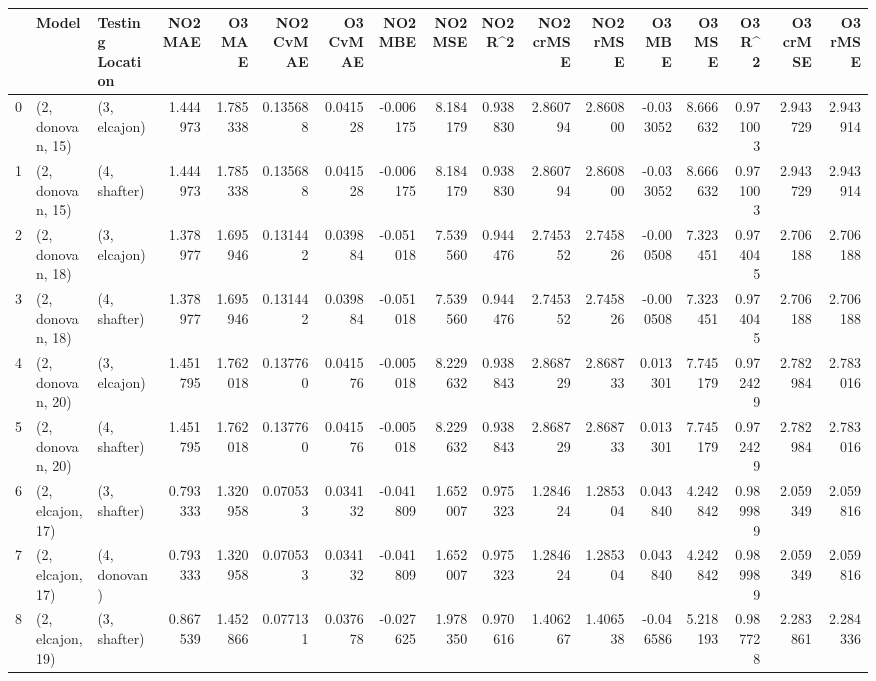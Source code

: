 \begin{tabular}{lllrrrrrrrrrrrrrr}
\toprule
{} &             Model & Testing Location &   NO2 MAE &    O3 MAE &  NO2 CvMAE &  O3 CvMAE &   NO2 MBE &    NO2 MSE &   NO2 R\textasciicircum2 &  NO2 crMSE &  NO2 rMSE &    O3 MBE &     O3 MSE &    O3 R\textasciicircum2 &  O3 crMSE &   O3 rMSE \\
\midrule
0  &  (2, donovan, 15) &     (3, elcajon) &  1.444973 &  1.785338 &   0.135688 &  0.041528 & -0.006175 &   8.184179 &  0.938830 &   2.860794 &  2.860800 & -0.033052 &   8.666632 &  0.971003 &  2.943729 &  2.943914 \\
1  &  (2, donovan, 15) &     (4, shafter) &  1.444973 &  1.785338 &   0.135688 &  0.041528 & -0.006175 &   8.184179 &  0.938830 &   2.860794 &  2.860800 & -0.033052 &   8.666632 &  0.971003 &  2.943729 &  2.943914 \\
2  &  (2, donovan, 18) &     (3, elcajon) &  1.378977 &  1.695946 &   0.131442 &  0.039884 & -0.051018 &   7.539560 &  0.944476 &   2.745352 &  2.745826 & -0.000508 &   7.323451 &  0.974045 &  2.706188 &  2.706188 \\
3  &  (2, donovan, 18) &     (4, shafter) &  1.378977 &  1.695946 &   0.131442 &  0.039884 & -0.051018 &   7.539560 &  0.944476 &   2.745352 &  2.745826 & -0.000508 &   7.323451 &  0.974045 &  2.706188 &  2.706188 \\
4  &  (2, donovan, 20) &     (3, elcajon) &  1.451795 &  1.762018 &   0.137760 &  0.041576 & -0.005018 &   8.229632 &  0.938843 &   2.868729 &  2.868733 &  0.013301 &   7.745179 &  0.972429 &  2.782984 &  2.783016 \\
5  &  (2, donovan, 20) &     (4, shafter) &  1.451795 &  1.762018 &   0.137760 &  0.041576 & -0.005018 &   8.229632 &  0.938843 &   2.868729 &  2.868733 &  0.013301 &   7.745179 &  0.972429 &  2.782984 &  2.783016 \\
6  &  (2, elcajon, 17) &     (3, shafter) &  0.793333 &  1.320958 &   0.070533 &  0.034132 & -0.041809 &   1.652007 &  0.975323 &   1.284624 &  1.285304 &  0.043840 &   4.242842 &  0.989989 &  2.059349 &  2.059816 \\
7  &  (2, elcajon, 17) &     (4, donovan) &  0.793333 &  1.320958 &   0.070533 &  0.034132 & -0.041809 &   1.652007 &  0.975323 &   1.284624 &  1.285304 &  0.043840 &   4.242842 &  0.989989 &  2.059349 &  2.059816 \\
8  &  (2, elcajon, 19) &     (3, shafter) &  0.867539 &  1.452866 &   0.077131 &  0.037678 & -0.027625 &   1.978350 &  0.970616 &   1.406267 &  1.406538 & -0.046586 &   5.218193 &  0.987728 &  2.283861 &  2.284336 \\

\end{tabular}
